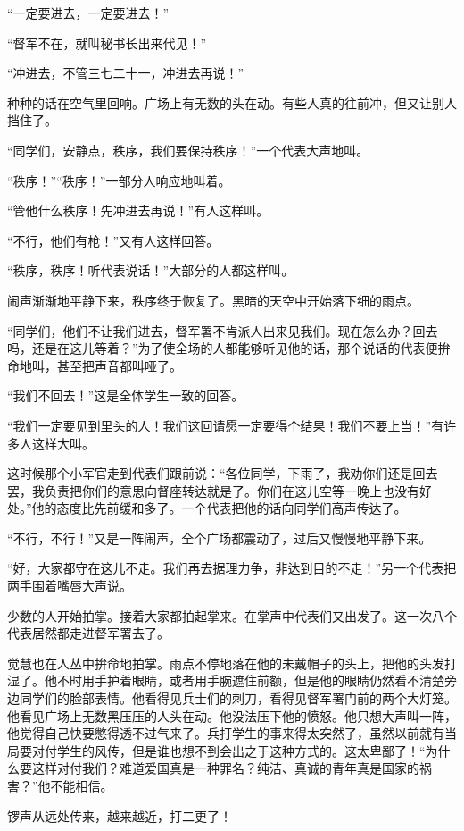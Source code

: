 \par “一定要进去，一定要进去！”
\par “督军不在，就叫秘书长出来代见！”
\par “冲进去，不管三七二十一，冲进去再说！”
\par 种种的话在空气里回响。广场上有无数的头在动。有些人真的往前冲，但又让别人挡住了。
\par “同学们，安静点，秩序，我们要保持秩序！”一个代表大声地叫。
\par “秩序！”“秩序！”一部分人响应地叫着。
\par “管他什么秩序！先冲进去再说！”有人这样叫。
\par “不行，他们有枪！”又有人这样回答。
\par “秩序，秩序！听代表说话！”大部分的人都这样叫。
\par 闹声渐渐地平静下来，秩序终于恢复了。黑暗的天空中开始落下细的雨点。
\par “同学们，他们不让我们进去，督军署不肯派人出来见我们。现在怎么办？回去吗，还是在这儿等着？”为了使全场的人都能够听见他的话，那个说话的代表便拚命地叫，甚至把声音都叫哑了。
\par “我们不回去！”这是全体学生一致的回答。
\par “我们一定要见到里头的人！我们这回请愿一定要得个结果！我们不要上当！”有许多人这样大叫。
\par 这时候那个小军官走到代表们跟前说：“各位同学，下雨了，我劝你们还是回去罢，我负责把你们的意思向督座转达就是了。你们在这儿空等一晚上也没有好处。”他的态度比先前缓和多了。一个代表把他的话向同学们高声传达了。
\par “不行，不行！”又是一阵闹声，全个广场都震动了，过后又慢慢地平静下来。
\par “好，大家都守在这儿不走。我们再去据理力争，非达到目的不走！”另一个代表把两手围着嘴唇大声说。
\par 少数的人开始拍掌。接着大家都拍起掌来。在掌声中代表们又出发了。这一次八个代表居然都走进督军署去了。
\par 觉慧也在人丛中拚命地拍掌。雨点不停地落在他的未戴帽子的头上，把他的头发打湿了。他不时用手护着眼睛，或者用手腕遮住前额，但是他的眼睛仍然看不清楚旁边同学们的脸部表情。他看得见兵士们的刺刀，看得见督军署门前的两个大灯笼。他看见广场上无数黑压压的人头在动。他没法压下他的愤怒。他只想大声叫一阵，他觉得自己快要憋得透不过气来了。兵打学生的事来得太突然了，虽然以前就有当局要对付学生的风传，但是谁也想不到会出之于这种方式的。这太卑鄙了！“为什么要这样对付我们？难道爱国真是一种罪名？纯洁、真诚的青年真是国家的祸害？”他不能相信。
\par 锣声从远处传来，越来越近，打二更了！
